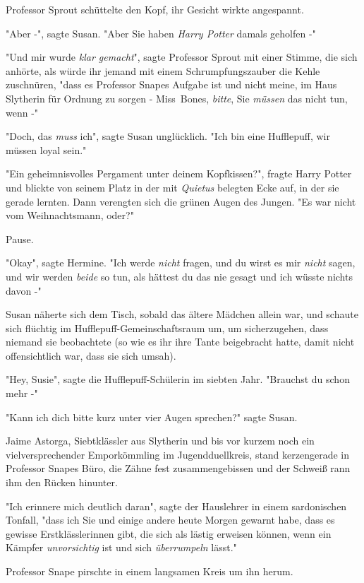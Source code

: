 {Professor Sprout schüttelte den Kopf, ihr Gesicht wirkte angespannt.

"Aber -", sagte Susan. "Aber Sie haben \emph{Harry Potter} damals geholfen -"

"Und mir wurde \emph{klar gemacht}", sagte Professor Sprout mit einer Stimme, die sich anhörte, als würde ihr jemand mit einem Schrumpfungszauber die Kehle zuschnüren, "dass es Professor Snapes Aufgabe ist und nicht meine, im Haus Slytherin für Ordnung zu sorgen - Miss~Bones, \emph{bitte}, Sie \emph{müssen} das nicht tun, wenn -"

"Doch, das \emph{muss} ich", sagte Susan unglücklich. "Ich bin eine Hufflepuff, wir müssen loyal sein."

"Ein geheimnisvolles Pergament unter deinem Kopfkissen?", fragte Harry Potter und blickte von seinem Platz in der mit \emph{Quietus} belegten Ecke auf, in der sie gerade lernten. Dann verengten sich die grünen Augen des Jungen. "Es war nicht vom Weihnachtsmann, oder?"

Pause.

"Okay", sagte Hermine. "Ich werde \emph{nicht} fragen, und du wirst es mir \emph{nicht} sagen, und wir werden \emph{beide} so tun, als hättest du das nie gesagt und ich wüsste nichts davon -"

Susan näherte sich dem Tisch, sobald das ältere Mädchen allein war, und schaute sich flüchtig im Hufflepuff-Gemeinschaftsraum um, um sicherzugehen, dass niemand sie beobachtete (so wie es ihr ihre Tante beigebracht hatte, damit nicht offensichtlich war, dass sie sich umsah).

"Hey, Susie", sagte die Hufflepuff-Schülerin im siebten Jahr. "Brauchst du schon mehr -"

"Kann ich dich bitte kurz unter vier Augen sprechen?" sagte Susan.

Jaime Astorga, Siebtklässler aus Slytherin und bis vor kurzem noch ein vielversprechender Emporkömmling im Jugendduellkreis, stand kerzengerade in Professor Snapes Büro, die Zähne fest zusammengebissen und der Schweiß rann ihm den Rücken hinunter.

"Ich erinnere mich deutlich daran", sagte der Hauslehrer in einem sardonischen Tonfall, "dass ich Sie und einige andere heute Morgen gewarnt habe, dass es gewisse Erstklässlerinnen gibt, die sich als lästig erweisen können, wenn ein Kämpfer \emph{unvorsichtig} ist und sich \emph{überrumpeln} lässt."

Professor Snape pirschte in einem langsamen Kreis um ihn herum.

}
